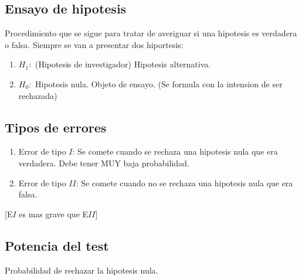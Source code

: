 \documentclass[titlepage,a4paper]{article}
\begin{document}
\subsection{Ensayo de hipotesis} 
Procedimiento que se sigue para tratar de averiguar si una hipotesis es verdadera o falsa.
Siempre se van a presentar dos hiportesis:
\begin{enumerate}
    \item $H_{1}:$ (Hipotesis de investigador) Hipotesis alternativa.
    \item $H_{0}:$ Hipotesis nula. Objeto de ensayo. (Se formula con la intension de ser rechazada)
\end{enumerate}
\subsection{Tipos de errores}
\begin{enumerate}
    \item Error de tipo $I$: Se comete cuando se rechaza una hipotesis nula que era verdadera. Debe tener MUY baja probabilidad.
    \item Error de tipo $II$: Se comete cuando no se rechaza una hipotesis nula que era falsa.
\end{enumerate}
[E$I$ es mas grave que E$II$]
\subsection{Potencia del test}
Probabilidad de rechazar la hipotesis nula.
\end{document}
